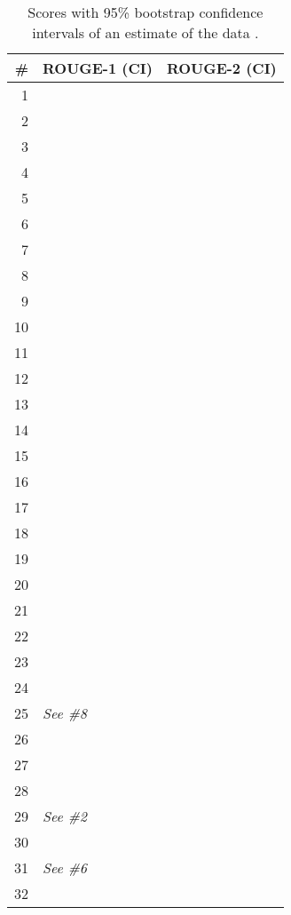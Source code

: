 \documentclass{article}
\begin{document}
\begin{table}[b]
    \caption{Scores with 95\% bootstrap confidence intervals of an estimate of the data \citep{doi:10.1113/jphysiol.2012.239376}.}
    \label{tab:bootstrap}
    \centering
    \begin{tabular}{rrrrr}
    \toprule
    \# & \multicolumn{2}{l}{ROUGE-1 (CI)} & \multicolumn{2}{l}{ROUGE-2 (CI)} \\
    \midrule
1 &  &  &  &  \\
    2 &  &  &  &  \\
    3 &  &  &  &  \\
    4 &  &  &  &  \\
    5 &  &  &  &  \\
    6 &  &  &  &  \\
    7 &  &  &  &  \\
    8 &  &  &  &  \\
9 &  &  &  &  \\
    10 &  &  &  &  \\
    11 &  &  &  &  \\
    12 &  &  &  &  \\
    13 &  &  &  &  \\
    14 &  &  &  &  \\
    15 &  &  &  &  \\
    16 &  &  &  &  \\
    17 &  &  &  &  \\
    18 &  &  &  & \\
    19 &  &  &  & \\
    20 &  &  &  & \\
    
    21 &  &  &  &  \\
    22 &  &  &  &  \\
    23 &  &  &  &  \\
    24 &  &  &  &  \\
    25 & \multicolumn{4}{l}{\textit{ See  \#8}} \\
    26 &  &  &  &  \\

    27 &  &  &  &  \\
    28 &  &  &  &  \\
    29 & \multicolumn{4}{l}{\textit{ See  \#2}} \\
    30 &  &  &  &  \\
    31 & \multicolumn{4}{l}{\textit{ See  \#6}} \\
    32 &  &  &  &  \\



    \bottomrule
    \end{tabular}
\end{table}
\end{document}

